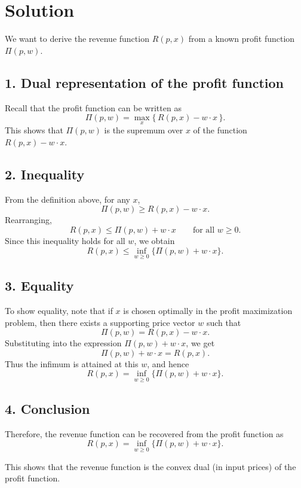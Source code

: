 \section*{Solution}

We want to derive the revenue function \(R(p,x)\) from a known profit function \(\Pi(p,w)\).

\subsection*{1. Dual representation of the profit function}

Recall that the profit function can be written as
\[
\Pi(p,w)=\max_{x}\{\,R(p,x)-w\cdot x\,\}.
\]
This shows that \(\Pi(p,w)\) is the supremum over \(x\) of the function \(R(p,x)-w\cdot x\).

\subsection*{2. Inequality}

From the definition above, for any \(x\),
\[
\Pi(p,w)\ge R(p,x)-w\cdot x.
\]
Rearranging,
\[
R(p,x)\le \Pi(p,w)+w\cdot x
\qquad \text{for all } w\ge 0.
\]
Since this inequality holds for all \(w\), we obtain
\[
R(p,x)\le \inf_{w\ge 0}\{\Pi(p,w)+w\cdot x\}.
\]

\subsection*{3. Equality}

To show equality, note that if \(x\) is chosen optimally in the profit maximization problem, then there exists a supporting price vector \(w\) such that
\[
\Pi(p,w)=R(p,x)-w\cdot x.
\]
Substituting into the expression \(\Pi(p,w)+w\cdot x\), we get
\[
\Pi(p,w)+w\cdot x
=
R(p,x).
\]
Thus the infimum is attained at this \(w\), and hence
\[
R(p,x)=\inf_{w\ge 0}\{\Pi(p,w)+w\cdot x\}.
\]

\subsection*{4. Conclusion}

Therefore, the revenue function can be recovered from the profit function as
\[
\boxed{
R(p,x)=\inf_{w\ge 0}\{\Pi(p,w)+w\cdot x\}.
}
\]

This shows that the revenue function is the convex dual (in input prices) of the profit function.



